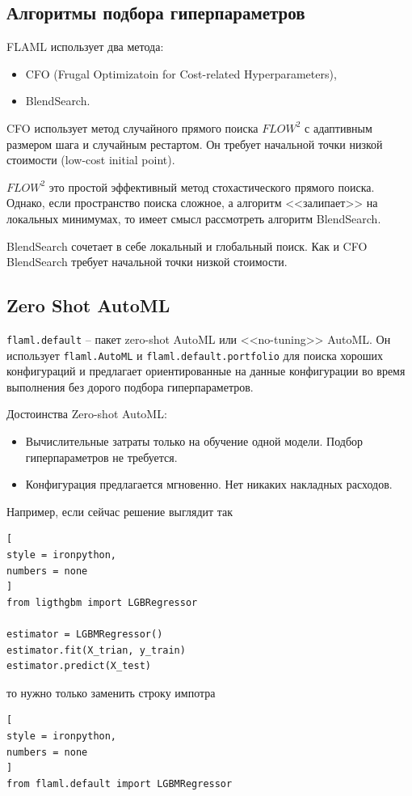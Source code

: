 \documentclass[%
	11pt,
	a4paper,
	utf8,
		]{article}
\begin{document}
\subsection{Алгоритмы подбора гиперпараметров}

FLAML использует два метода:
\begin{itemize}
	\item CFO (Frugal Optimizatoin for Cost-related Hyperparameters),
	
	\item BlendSearch.
\end{itemize}

CFO использует метод случайного прямого поиска $ FLOW^2 $ с адаптивным размером шага и случайным рестартом. Он требует начальной точки низкой стоимости (low-cost initial point). 

$ FLOW^2 $ это простой эффективный метод стохастического прямого поиска. Однако, если пространство поиска сложное, а алгоритм <<залипает>> на локальных минимумах, то имеет смысл рассмотреть алгоритм BlendSearch.

BlendSearch сочетает в себе локальный и глобальный поиск. Как и CFO BlendSearch требует начальной точки низкой стоимости.

\subsection{Zero Shot AutoML}

\verb|flaml.default| -- пакет zero-shot AutoML или <<no-tuning>> AutoML. Он использует \verb|flaml.AutoML| и \verb|flaml.default.portfolio| для поиска хороших конфигураций и предлагает ориентированные на данные конфигурации во время выполнения без дорого подбора гиперпараметров.

Достоинства Zero-shot AutoML:
\begin{itemize}
	\item Вычислительные затраты только на обучение одной модели. Подбор гиперпараметров не требуется.
	
	\item Конфигурация предлагается мгновенно. Нет никаких накладных расходов.
\end{itemize}

Например, если сейчас решение выглядит так
\begin{lstlisting}[
style = ironpython,
numbers = none
]
from ligthgbm import LGBRegressor

estimator = LGBMRegressor()
estimator.fit(X_trian, y_train)
estimator.predict(X_test)
\end{lstlisting}
то нужно только заменить строку импотра
\begin{lstlisting}[
style = ironpython,
numbers = none
]
from flaml.default import LGBMRegressor
\end{lstlisting}
\end{document}
